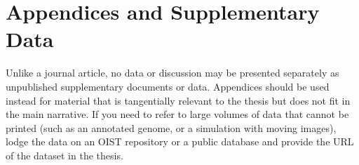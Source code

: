 

\chapter{Appendices and Supplementary Data} \label{appA}

Unlike a journal article, no data or discussion may be presented separately as unpublished supplementary documents or data.  Appendices should be used instead for material that is tangentially relevant to the thesis but does not fit in the main narrative. If you need to refer to large volumes of data that cannot be printed (such as an annotated genome, or a simulation with moving images), lodge the data on an OIST repository or a public database and provide the URL of the dataset in the thesis.  
